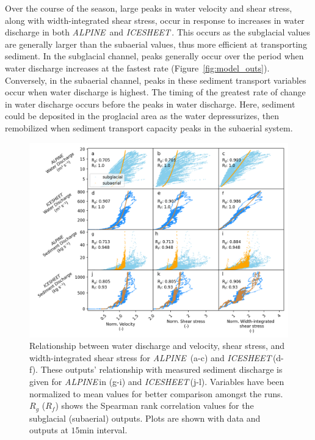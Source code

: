 \documentclass[11pt]{article}
\newcommand{\alpine}{\textit{ALPINE}\,}
\newcommand{\icesheet}{\textit{ICESHEET}\,}
\newcommand{\unit}[1]{$\mathrm{#1}$}
\begin{document}
Over the course of the season, large peaks in water velocity and shear stress, along with width-integrated shear stress, occur in response to increases in water discharge in both \alpine{} and \icesheet{}.
This occurs as the subglacial values are generally larger than the subaerial values, thus more efficient at transporting sediment.
In the subglacial channel, peaks generally occur over the period when water discharge increases at the fastest rate (Figure~\ref{fig:model_outs}).
Conversely, in the subaerial channel, peaks in these sediment transport variables occur when water discharge is highest.
The timing of the greatest rate of change in water discharge occurs before the peaks in water discharge.
Here, sediment could be deposited in the proglacial area as the water depressurizes, then remobilized when sediment transport capacity peaks in the subaerial system.

\begin{figure}[h]
  \centering
  \includegraphics[width=0.9\linewidth]{Fig3.png}
  \caption{Relationship between water discharge and velocity, shear stress, and width-integrated shear stress for \alpine{} (a-c) and \icesheet (d-f).
    These outputs' relationship with measured sediment discharge is given for \alpine in (g-i) and \icesheet (j-l).
    Variables have been normalized to mean values for better comparison amongst the runs.
    $R_g$ ($R_f$) shows the Spearman rank correlation values for the subglacial (subaerial) outputs.
    Plots are shown with data and outputs at $15$\unit{min} interval.
  }
  \label{fig:Qw_vari}
\end{figure}
\end{document}
